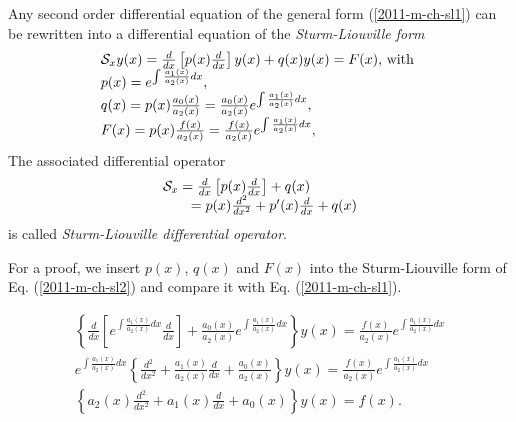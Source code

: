 Any second order differential equation of the general form (\ref{2011-m-ch-sl1})
can be rewritten into a differential equation of the {\em Sturm-Liouville form}
\begin{equation}
\begin{array}  {l}
{\cal S}_{x} y(x) =
\frac{d}{dx}
\left[
p(x)
\frac{d}{dx}
\right]  y(x)
+
q(x) y(x)
=
F(x)\textrm{, with }\\
p(x)=e^{\int \frac{a_1(x)}{a_2(x)} dx},\\
q(x)=p(x) \frac{a_0(x)}{a_2(x)}=  \frac{a_0(x)}{a_2(x)}e^{\int \frac{a_1(x)}{a_2(x)} dx},\\
F(x)=p(x) \frac{f(x)}{a_2(x)}= \frac{f(x)}{a_2(x)} e^{\int \frac{a_1(x)}{a_2(x)} dx},\\
\end{array}
\label{2011-m-ch-sl2}
\end{equation}
The associated differential operator
\begin{equation}
\begin{array}  {l}
{\cal S}_{x}  =
\frac{d}{dx}
\left[
p(x)
\frac{d}{dx}
\right]
+
q(x)     \\
\qquad =
p(x)\frac{d^2}{dx^2}
+
p'(x)
\frac{d}{dx}
+
q(x)
\end{array}
\label{2011-m-ch-sl3}
\end{equation}
is called
{\em Sturm-Liouville differential operator}.

{\color{OliveGreen}
\bproof
For a proof, we insert $p(x)$, $q(x)$ and $F(x)$
into the Sturm-Liouville form of Eq. (\ref{2011-m-ch-sl2}) and compare it with
Eq. (\ref{2011-m-ch-sl1}).

\begin{equation}
\begin{array}  {l}
\left\{  \frac{d}{dx}
\left[
e^{\int \frac{a_1(x)}{a_2(x)} dx}
\frac{d}{dx}
\right]
+
\frac{a_0(x)}{a_2(x)}e^{\int \frac{a_1(x)}{a_2(x)} dx} \right\} y(x)
=
\frac{f(x)}{a_2(x)}e^{\int \frac{a_1(x)}{a_2(x)} dx}\\
e^{\int \frac{a_1(x)}{a_2(x)} dx} \left\{
\frac{d^2}{dx^2} +
\frac{a_1(x)}{a_2(x)}
\frac{d}{dx}
+
\frac{a_0(x)}{a_2(x)}\right\} y(x)
=
\frac{f(x)}{a_2(x)}e^{\int \frac{a_1(x)}{a_2(x)} dx}\\
\left\{
a_2(x)\frac{d^2}{dx^2} +
a_1(x)\frac{d}{dx}
+
a_0(x)\right\} y(x)
=
f(x).
\end{array}
\label{2011-m-ch-sl21}
\end{equation}

\eproof
}


